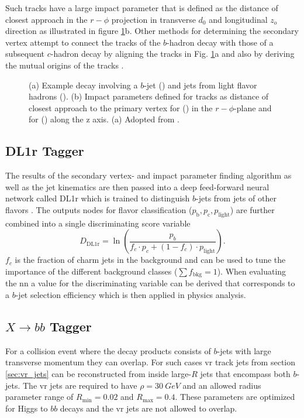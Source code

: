 Such tracks have a large impact parameter that is defined as the distance of closest approach in the $r-\phi$ projection in transverse $d_0$ and longitudinal $z_o$ direction \citep{aad2008atlas} as illustrated in figure \ref{fig:secondary_vertex}b. Other methods for determining the secondary vertex attempt to connect the tracks of the $b$-hadron decay with those of a subsequent $c$-hadron decay by aligning the tracks in Fig. \ref{fig:secondary_vertex}a and also by deriving the mutual origins of the tracks \citep{ATL-PHYS-PUB-2017-013}.
\begin{figure}[]
  \centering
  \caption{(a) Example decay involving a $b$-jet () and jets from light flavor hadrons (). (b) Impact parameters defined for tracks as distance of closest approach to the primary vertex for (\mbox{\color[HTML]{009245}{$d_0$}}) in the $r-\phi$-plane and for (\mbox{\color[HTML]{EC1C25}{$z_0$}}) along the z axis. (a) Adopted from \cite{Guth:2765038}.}
  \label{fig:secondary_vertex}
\end{figure}

\subsection{DL1r Tagger}
The results of the secondary vertex- and impact parameter finding algorithm as well as the jet kinematics are then passed into a deep feed-forward neural network called DL1r which is trained to distinguish $b$-jets from jets of other flavors \citep{atlas2022atlas}. The outputs nodes for flavor classification ($p_\mathrm{b}, p_\mathrm{c}, p_\mathrm{light}$) are further combined into a single discriminating score variable
\begin{equation}
  D_\mathrm{DL1r}=\ln\left(\frac{p_b}{f_c \cdot p_c + (1-f_c)\cdot p_\mathrm{light} }\right).
\end{equation}
$f_c$ is the fraction of charm jets in the background and can be used to tune the importance of the different background classes ($\sum f_\mathrm{bkg} =1$). When evaluating the \ac{nn} a value for the discriminating variable can be derived that corresponds to a $b$-jet selection efficiency which is then applied in physics analysis.

\subsection{$X\rightarrow bb$ Tagger}\label{sec:xbb}
For a collision event where the decay products consists of $b$-jets with large transverse momentum they can overlap. For such cases \ac{vr} track jets from section \ref{sec:vr_jets} can be reconstructed from inside large-$R$ jets that encompass both $b$-jets. The \ac{vr} jets are required to have $\rho=\qty[]{30}{GeV}$ and an allowed radius parameter range of $R_\text{min}=0.02$ and $R_\text{max}=0.4$. These parameters are optimized for Higgs to $bb$ decays \citep{ATL-PHYS-PUB-2017-010} and the \ac{vr} jets are not allowed to overlap.

